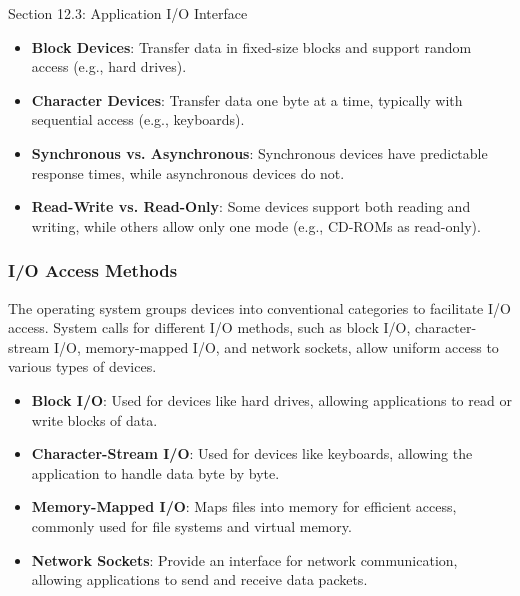\begin{notes}{Section 12.3: Application I/O Interface}
    \begin{highlight}
    
        \begin{itemize}
            \item \textbf{Block Devices}: Transfer data in fixed-size blocks and support random access (e.g., hard drives).
            \item \textbf{Character Devices}: Transfer data one byte at a time, typically with sequential access (e.g., keyboards).
            \item \textbf{Synchronous vs. Asynchronous}: Synchronous devices have predictable response times, while asynchronous devices do not.
            \item \textbf{Read-Write vs. Read-Only}: Some devices support both reading and writing, while others allow only one mode (e.g., CD-ROMs as read-only).
        \end{itemize}
    
    \end{highlight}
    
    \subsubsection*{I/O Access Methods}
    
    The operating system groups devices into conventional categories to facilitate I/O access. System calls for different I/O methods, such as block I/O, character-stream I/O, memory-mapped I/O, and 
    network sockets, allow uniform access to various types of devices.
    
    \begin{highlight}
    
        \begin{itemize}
            \item \textbf{Block I/O}: Used for devices like hard drives, allowing applications to read or write blocks of data.
            \item \textbf{Character-Stream I/O}: Used for devices like keyboards, allowing the application to handle data byte by byte.
            \item \textbf{Memory-Mapped I/O}: Maps files into memory for efficient access, commonly used for file systems and virtual memory.
            \item \textbf{Network Sockets}: Provide an interface for network communication, allowing applications to send and receive data packets.
        \end{itemize}
    

\end{highlight}
\end{notes}
